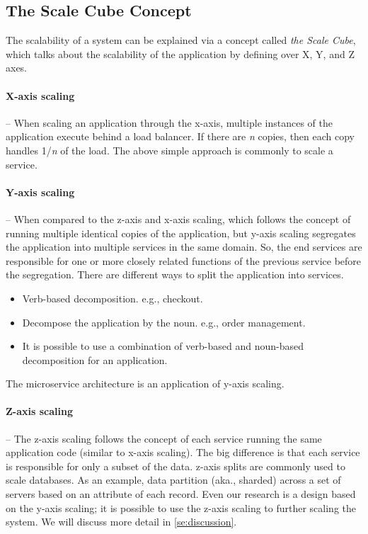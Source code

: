 \subsection{The Scale Cube Concept}
\label{subse:scale_cube}

The scalability of a system can be explained via a concept called \emph{the Scale Cube}, which talks about the scalability of the application by defining over X, Y, and Z axes.

\paragraph{X-axis scaling} -- When scaling an application through the x-axis, multiple instances of the application execute behind a load balancer. If there are \textit{n} copies, then each copy handles 1/\textit{n} of the load. The above simple approach is commonly to scale a service.

\paragraph{Y-axis scaling} -- When compared to the z-axis and x-axis scaling, which follows the concept of running multiple identical copies of the application, but y-axis scaling segregates the application into multiple services in the same domain. So, the end services are responsible for one or more closely related functions of the previous service before the segregation. There are different ways to split the application into services.
\begin{itemize}
    \item Verb-based decomposition. e.g., checkout.
    \item Decompose the application by the noun. e.g., order management.
    \item It is possible to use a combination of verb-based and noun-based decomposition for an application.
\end{itemize}
The microservice architecture is an application of y-axis scaling.

\paragraph{Z-axis scaling} -- The z-axis scaling follows the concept of each service running the same application code (similar to x-axis scaling). The big difference is that each service is responsible for only a subset of the data. z-axis splits are commonly used to scale databases. As an example, data partition (aka., sharded) across a set of servers based on an attribute of each record.
Even our research is a design based on the y-axis scaling; it is possible to use the z-axis scaling to further scaling the system. We will discuss more detail in \cref{se:discussion}.


